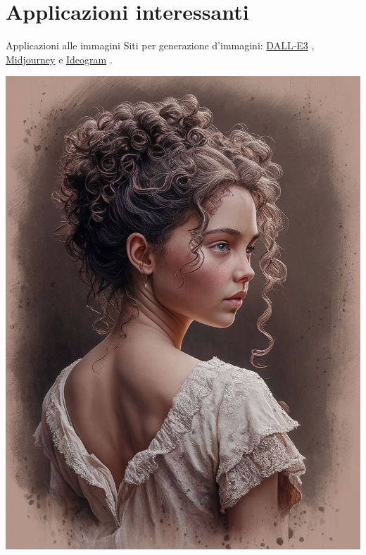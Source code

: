 \documentclass[aspectratio=169]{beamer}
\begin{document}
\section{Applicazioni interessanti}
\sectionpage


\begin{frame}{Applicazioni alle immagini}
    Siti per generazione d'immagini: \href{https://openai.com/index/dall-e-3/}{DALL-E3} , \href{https://www.midjourney.com/home}{Midjourney}   e \href{https://ideogram.ai/t/top/1}{Ideogram} .
        \begin{center}
            \begin{minipage}{0.23\textwidth}
                \includegraphics[height=0.7\textheight, width=\textwidth]{AIimages/ideogram1.png}

\end{minipage}
\end{center}
\end{frame}
\end{document}
